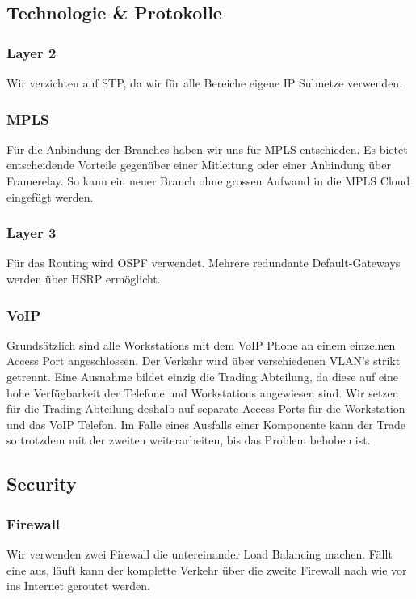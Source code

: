 \subsection{Technologie \& Protokolle}
\subsubsection{Layer 2}
Wir verzichten auf STP, da wir für alle Bereiche eigene IP Subnetze verwenden. 

\subsubsection{MPLS}
Für die Anbindung der Branches haben wir uns für MPLS entschieden. Es bietet entscheidende Vorteile gegenüber einer Mitleitung oder einer Anbindung über Framerelay. So kann ein neuer Branch ohne grossen Aufwand in die MPLS Cloud eingefügt werden.

\subsubsection{Layer 3}
Für das Routing wird OSPF verwendet. Mehrere redundante Default-Gateways werden über HSRP ermöglicht.

\subsubsection{VoIP}
Grundsätzlich sind alle Workstations mit dem VoIP Phone an einem einzelnen Access Port angeschlossen. Der Verkehr wird über verschiedenen VLAN's strikt getrennt. Eine Ausnahme bildet einzig die Trading Abteilung, da diese auf eine hohe Verfügbarkeit der Telefone und Workstations angewiesen sind. Wir setzen für die Trading Abteilung deshalb auf separate Access Ports für die Workstation und das VoIP Telefon. Im Falle eines Ausfalls einer Komponente kann der Trade so trotzdem mit der zweiten weiterarbeiten, bis das Problem behoben ist.

\subsection{Security}

\subsubsection{Firewall}
Wir verwenden zwei Firewall die untereinander Load Balancing machen. Fällt eine aus, läuft kann der komplette Verkehr über die zweite Firewall nach wie vor ins Internet geroutet werden.

